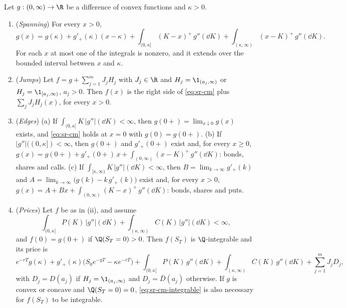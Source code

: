 \begin{theorem}\label{thm:sr-carr-madan}
Let $g:(0,\infty)\to\R$ be a difference of convex functions and $\kappa>0$.
\begin{enumerate}[label=(\roman*)]
  \item (\emph{Spanning}) For every $x>0$,
    \begin{equation}\label{eq:sr-cm}
      g(x)=g(\kappa)+g'_+(\kappa)(x-\kappa)+\int_{(0,\kappa]}(K-x)^+\,g''(\dd K)+\int_{(\kappa,\infty)}(x-K)^+\,g''(\dd K).
    \end{equation}
    For each $x$ at most one of the integrals is nonzero, and it extends over the bounded interval between
    $x$ and $\kappa$.
  \item (\emph{Jumps}) Let $f=g+\sum_{j=1}^mJ_jH_j$ with $J_j\in\R$ and $H_j=\1_{(a_j,\infty)}$ or
    $H_j=\1_{[a_j,\infty)}$, $a_j>0$. Then $f(x)$ is the right side of \eqref{eq:sr-cm} plus
    $\sum_jJ_jH_j(x)$, for every $x>0$.
  \item (\emph{Edges}) (a) If $\int_{(0,\kappa]}K\,|g''|(\dd K)<\infty$, then $g(0+)=\lim_{x\downarrow0}g(x)$
    exists, and \eqref{eq:sr-cm} holds at $x=0$ with $g(0)=g(0+)$.
    (b) If $|g''|((0,\kappa])<\infty$, then $g(0+)$ and $g'_+(0+)$ exist and, for every $x\ge0$,
    $g(x)=g(0+)+g'_+(0+)\,x+\int_{(0,\infty)}(x-K)^+\,g''(\dd K)$: bonds, shares and calls.
    (c) If $\int_{[\kappa,\infty)}K\,|g''|(\dd K)<\infty$, then $B=\lim_{k\to\infty}g'_+(k)$ and
    $A=\lim_{k\to\infty}\big(g(k)-k\,g'_+(k)\big)$ exist and, for every $x>0$,
    $g(x)=A+Bx+\int_{(0,\infty)}(K-x)^+\,g''(\dd K)$: bonds, shares and puts.
  \item (\emph{Prices}) Let $f$ be as in (ii), and assume
    \begin{equation}\label{eq:sr-cm-integrable}
      \int_{(0,\kappa]}P(K)\,|g''|(\dd K)+\int_{(\kappa,\infty)}C(K)\,|g''|(\dd K)<\infty,
    \end{equation}
    and $f(0)=g(0+)$ if $\Q(S_T=0)>0$. Then $f(S_T)$ is
    $\Q$-integrable and its price is
    \begin{equation}\label{eq:sr-cm-price}
      e^{-rT}g(\kappa)+g'_+(\kappa)\big(S_0e^{-yT}-\kappa e^{-rT}\big)+\int_{(0,\kappa]}P(K)\,g''(\dd K)
      +\int_{(\kappa,\infty)}C(K)\,g''(\dd K)+\sum_{j=1}^mJ_jD_j,
    \end{equation}
    with $D_j=D(a_j)$ if $H_j=\1_{(a_j,\infty)}$ and $D_j=\bar D(a_j)$ otherwise. If $g$ is convex or concave
    and $\Q(S_T=0)=0$, \eqref{eq:sr-cm-integrable} is also necessary for $f(S_T)$ to be integrable.
\end{enumerate}
\end{theorem}

